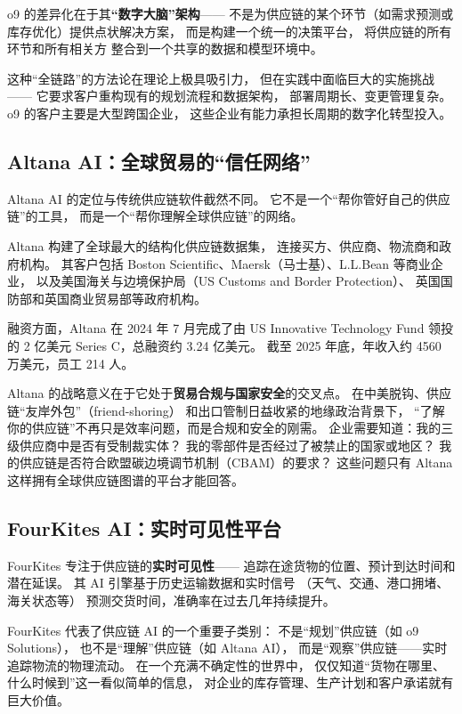o9 的差异化在于其\textbf{``数字大脑''架构}——
不是为供应链的某个环节（如需求预测或库存优化）提供点状解决方案，
而是构建一个统一的决策平台，
将供应链的所有环节和所有相关方
整合到一个共享的数据和模型环境中。

这种``全链路''的方法论在理论上极具吸引力，
但在实践中面临巨大的实施挑战——
它要求客户重构现有的规划流程和数据架构，
部署周期长、变更管理复杂。
o9 的客户主要是大型跨国企业，
这些企业有能力承担长周期的数字化转型投入。

\subsection{Altana AI：全球贸易的``信任网络''}

Altana AI 的定位与传统供应链软件截然不同。
它不是一个``帮你管好自己的供应链''的工具，
而是一个``帮你理解全球供应链''的网络。

Altana 构建了全球最大的结构化供应链数据集，
连接买方、供应商、物流商和政府机构。
其客户包括 Boston Scientific、Maersk（马士基）、L.L.Bean 等商业企业，
以及美国海关与边境保护局（US Customs and Border Protection）、
英国国防部和英国商业贸易部等政府机构。

融资方面，Altana 在 2024 年 7 月完成了由 US Innovative Technology Fund
领投的 2 亿美元 Series C，总融资约 3.24 亿美元。
截至 2025 年底，年收入约 4560 万美元，员工 214 人。

Altana 的战略意义在于它处于\textbf{贸易合规与国家安全}的交叉点。
在中美脱钩、供应链``友岸外包''（friend-shoring）
和出口管制日益收紧的地缘政治背景下，
``了解你的供应链''不再只是效率问题，而是合规和安全的刚需。
企业需要知道：我的三级供应商中是否有受制裁实体？
我的零部件是否经过了被禁止的国家或地区？
我的供应链是否符合欧盟碳边境调节机制（CBAM）的要求？
这些问题只有 Altana 这样拥有全球供应链图谱的平台才能回答。

\subsection{FourKites AI：实时可见性平台}

FourKites 专注于供应链的\textbf{实时可见性}——
追踪在途货物的位置、预计到达时间和潜在延误。
其 AI 引擎基于历史运输数据和实时信号
（天气、交通、港口拥堵、海关状态等）
预测交货时间，准确率在过去几年持续提升。

FourKites 代表了供应链 AI 的一个重要子类别：
不是``规划''供应链（如 o9 Solutions），
也不是``理解''供应链（如 Altana AI），
而是``观察''供应链——实时追踪物流的物理流动。
在一个充满不确定性的世界中，
仅仅知道``货物在哪里、什么时候到''这一看似简单的信息，
对企业的库存管理、生产计划和客户承诺就有巨大价值。

